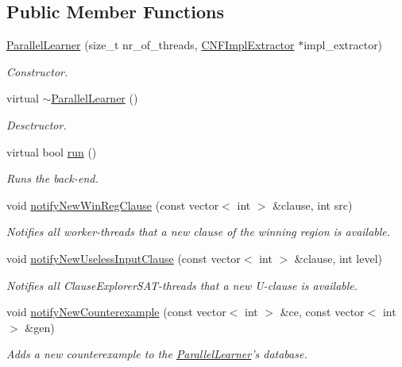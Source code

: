 \subsection*{Public Member Functions}
\begin{DoxyCompactItemize}
\item 
\hyperlink{classParallelLearner_af19878077a2dff8ade1de01be095137d}{Parallel\-Learner} (size\-\_\-t nr\-\_\-of\-\_\-threads, \hyperlink{classCNFImplExtractor}{C\-N\-F\-Impl\-Extractor} $\ast$impl\-\_\-extractor)
\begin{DoxyCompactList}\small\item\em Constructor. \end{DoxyCompactList}\item 
virtual \hyperlink{classParallelLearner_a42d85a531cab28bdcb345c37a0b08730}{$\sim$\-Parallel\-Learner} ()
\begin{DoxyCompactList}\small\item\em Desctructor. \end{DoxyCompactList}\item 
virtual bool \hyperlink{classParallelLearner_a93acb74e7c8504d0ef2bd3697441b745}{run} ()
\begin{DoxyCompactList}\small\item\em Runs the back-\/end. \end{DoxyCompactList}\item 
void \hyperlink{classParallelLearner_a10b8346745051c95f05a1bc8356fcf8d}{notify\-New\-Win\-Reg\-Clause} (const vector$<$ int $>$ \&clause, int src)
\begin{DoxyCompactList}\small\item\em Notifies all worker-\/threads that a new clause of the winning region is available. \end{DoxyCompactList}\item 
void \hyperlink{classParallelLearner_a0a8405e4fb7331f3f3df2711fdaebdab}{notify\-New\-Useless\-Input\-Clause} (const vector$<$ int $>$ \&clause, int level)
\begin{DoxyCompactList}\small\item\em Notifies all Clause\-Explorer\-S\-A\-T-\/threads that a new U-\/clause is available. \end{DoxyCompactList}\item 
void \hyperlink{classParallelLearner_a8c59cc455059943f8f9cdb8a60526f5c}{notify\-New\-Counterexample} (const vector$<$ int $>$ \&ce, const vector$<$ int $>$ \&gen)
\begin{DoxyCompactList}\small\item\em Adds a new counterexample to the \hyperlink{classParallelLearner}{Parallel\-Learner}'s database. \end{DoxyCompactList}\item 

\end{DoxyCompactItemize}

